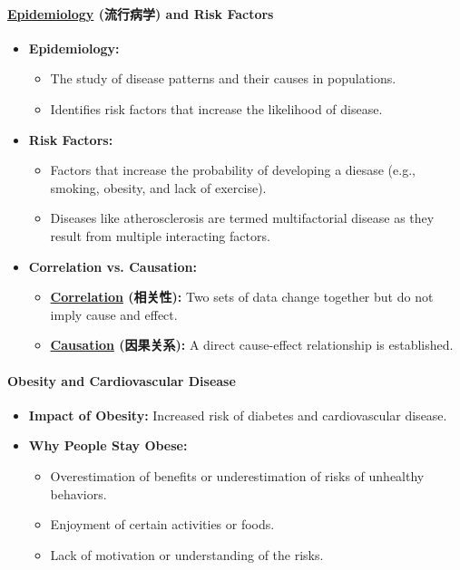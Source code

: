 \paragraph{\underline{Epidemiology} (流行病学) and Risk Factors}
\begin{itemize}
    \item \textbf{Epidemiology:}
    \begin{itemize}
        \item The study of disease patterns and their causes in populations.
        \item Identifies risk factors that increase the likelihood of disease.
    \end{itemize}
    \item \textbf{Risk Factors:}
    \begin{itemize}
        \item Factors that increase the probability of developing a diesase (e.g., smoking, obesity, and lack of exercise).
        \item Diseases like atherosclerosis are termed multifactorial disease as they result from multiple interacting factors.
    \end{itemize}
    \item \textbf{Correlation vs. Causation:}
    \begin{itemize}
        \item \textbf{\underline{Correlation} (相关性):} Two sets of data change together but do not imply cause and effect.
        \item \textbf{\underline{Causation} (因果关系):} A direct cause-effect relationship is established.
    \end{itemize}
\end{itemize}

\paragraph{Obesity and Cardiovascular Disease}
\begin{itemize}
    \item \textbf{Impact of Obesity:} Increased risk of diabetes and cardiovascular disease.
    \item \textbf{Why People Stay Obese:}
    \begin{itemize}
        \item Overestimation of benefits or underestimation of risks of unhealthy behaviors.
        \item Enjoyment of certain activities or foods.
        \item Lack of motivation or understanding of the risks.
    \end{itemize}
\end{itemize}